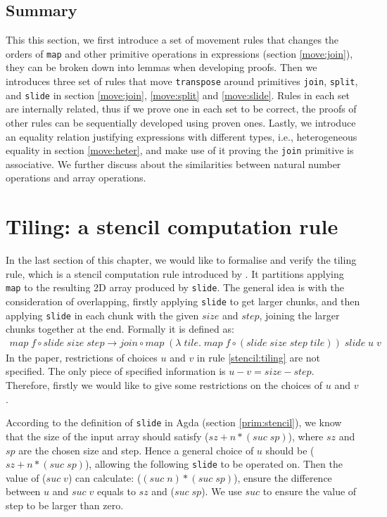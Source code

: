 \documentclass{l4proj}
\begin{document}
\subsection{Summary}
\label{move:summary}
This this section, we first introduce a set of movement rules that changes the orders of \texttt{map} and other primitive operations in expressions (section \ref{move:join}), they can be broken down into lemmas when developing proofs. Then we introduces three set of rules that move \texttt{transpose} around primitives \texttt{join}, \texttt{split}, and \texttt{slide} in section \ref{move:join}, \ref{move:split} and \ref{move:slide}. Rules in each set are internally related, thus if we prove one in each set to be correct, the proofs of other rules can be sequentially developed using proven ones. Lastly, we introduce an equality relation justifying expressions with different types, i.e., heterogeneous equality in section \ref{move:heter}, and make use of it proving the \texttt{join} primitive is associative. We further discuss about the similarities between natural number operations and array operations.

\section{Tiling: a stencil computation rule}
\label{sec:stencil}
In the last section of this chapter, we would like to formalise and verify the tiling rule, which is a stencil computation rule introduced by \cite{hagedorn2018high}. It partitions applying \texttt{map} to the resulting 2D array produced by \texttt{slide}. The general idea is with the consideration of overlapping, firstly applying \texttt{slide} to get larger chunks, and then applying \texttt{slide} in each chunk with the given $size$ and $step$, joining the larger chunks together at the end. Formally it is defined as:
\begin{align}
    \label{stencil:tiling}
    map\; f \circ slide\; size\; step \to join \circ map\; (\lambda\; tile.\; map\; f \circ (slide\; size\; step\; tile))\; slide\; u\; v
\end{align}
In the paper, restrictions of choices $u$ and $v$ in rule \ref{stencil:tiling} are not specified. The only piece of specified information is $u - v = size - step$. Therefore, firstly we would like to give some restrictions on the choices of $u$ and $v$.

According to the definition of \texttt{slide} in Agda (section \ref{prim:stencil}), we know that the size of the input array should satisfy ($sz + n * (suc\; sp)$), where $sz$ and $sp$ are the chosen size and step. Hence a general choice of $u$ should be ($sz + n * (suc\; sp)$), allowing the following \texttt{slide} to be operated on. Then the value of ($suc\; v$) can calculate: ($(suc\; n) * (suc\; sp)$), ensure the difference between $u$ and $suc\; v$ equals to $sz$ and ($suc\; sp$). We use $suc$ to ensure the value of step to be larger than zero.
\end{document}
